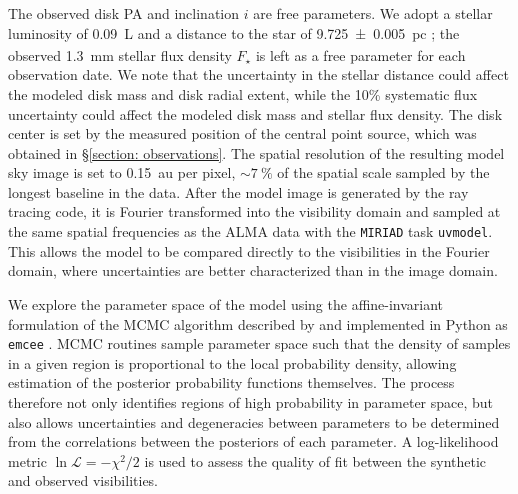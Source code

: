 \documentclass[modern]{aastex62}
\begin{document}
The observed disk PA and inclination $i$ are free parameters.
We adopt a stellar luminosity of \SI{0.09}{L_\sun} \citep{plavchan09} and a distance to the star of \SI{9.725 \pm 0.005}{pc}
\citep{gaia_DR2}; the observed \SI{1.3}{mm} stellar flux density $F_\star$ is left as a free parameter for each observation date.
We note that the uncertainty in the stellar distance could affect the modeled disk mass and disk radial extent, while the 10\% systematic flux uncertainty could affect the modeled disk mass and stellar flux density.
The disk center is set by the measured position of the central point source, which was obtained in \S \ref{section: observations}.
The spatial resolution of the resulting model sky image is set to \SI{0.15}{au} per pixel, $\sim \SI{7}{\percent}$ of the spatial scale sampled by the longest baseline in the data. 
After the model image is generated by the ray tracing code, it is Fourier transformed into the visibility domain and sampled at the same spatial frequencies as the ALMA data with the \texttt{MIRIAD} task \texttt{uvmodel}.
This allows the model to be compared directly to the visibilities in the Fourier domain, where uncertainties are better characterized than in the image domain.

We explore the parameter space of the model using the affine-invariant formulation of the MCMC algorithm described by \citet{goodmanweare10} and implemented in Python as \texttt{emcee} \citep{foreman-mackey13}.  
MCMC routines sample parameter space such that the density of samples in a given region is proportional to the local probability density, allowing estimation of the posterior probability functions themselves.
The process therefore not only identifies regions of high probability in parameter space, but also allows uncertainties and degeneracies between parameters to be determined from the correlations between the posteriors of each parameter. 
A log-likelihood metric $\ln \mathcal{L} = -\chi^2 / 2$ is used to assess the quality of fit between the synthetic and observed visibilities.
\end{document}
